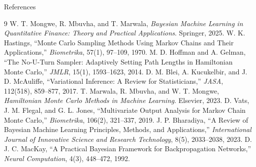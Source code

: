 \documentclass[aspectratio=169,10pt]{beamer}
\begin{document}
\begin{frame}{References}
  \small
  \begin{thebibliography}{9}
      W. T. Mongwe, R. Mbuvha, and T. Marwala,
      \textit{Bayesian Machine Learning in Quantitative Finance: Theory and
      Practical Applications}. Springer, 2025.
      W. K. Hastings,
      ``Monte Carlo Sampling Methods Using Markov Chains and Their
      Applications,'' \textit{Biometrika}, 57(1), 97--109, 1970.
      M. D. Hoffman and A. Gelman,
      ``The No-U-Turn Sampler: Adaptively Setting Path Lengths in
      Hamiltonian Monte Carlo,'' \textit{JMLR}, 15(1), 1593--1623, 2014.
      D. M. Blei, A. Kucukelbir, and J. D. McAuliffe,
      ``Variational Inference: A Review for Statisticians,''
      \textit{JASA}, 112(518), 859--877, 2017.
      T. Marwala, R. Mbuvha, and W. T. Mongwe,
      \textit{Hamiltonian Monte Carlo Methods in Machine Learning}.
      Elsevier, 2023.
      D. Vats, J. M. Flegal, and G. L. Jones,
      ``Multivariate Output Analysis for Markov Chain Monte Carlo,''
      \textit{Biometrika}, 106(2), 321--337, 2019.
      J. P. Bharadiya,
      ``A Review of Bayesian Machine Learning Principles, Methods, and
      Applications,'' \textit{International Journal of Innovative Science
      and Research Technology}, 8(5), 2033--2038, 2023.
      D. J. C. MacKay,
      ``A Practical Bayesian Framework for Backpropagation Networks,''
      \textit{Neural Computation}, 4(3), 448--472, 1992.
  \end{thebibliography}
\end{frame}
\end{document}
